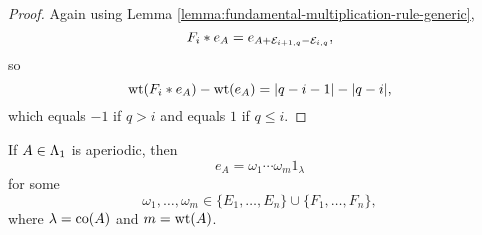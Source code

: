 \documentclass[a4paper, 11pt, twoside]{report}
\begin{document}
\begin{proof}
Again using Lemma \ref{lemma:fundamental-multiplication-rule-generic},
\begin{equation*}
F_i\ast e_A = e_{A + \mathcal{E}_{i+1,q} - \mathcal{E}_{i,q}},
\end{equation*}
so
\begin{equation*}
\operatorname{wt}(F_i\ast e_A) - \operatorname{wt}(e_A) = |q-i-1| - |q-i|,
\end{equation*}
which equals $-1$ if $q>i$ and equals $1$ if $q\le i$.
\end{proof}

\begin{lemma}\label{lemma:factorising-aperiodic-elements}
If $A\in\Lambda_1{}$ is aperiodic, then
\begin{equation*}
e_A = \omega_1\cdots\omega_m 1_\lambda
\end{equation*}
for some
\begin{equation*}
\omega_1,\ldots,\omega_m\in\{E_1,\ldots,E_n\}\cup\{F_1,\ldots,F_n\},
\end{equation*}
where $\lambda=\operatorname{co}(A)$ and $m=\operatorname{wt}(A)$.
\end{lemma}
\end{document}
